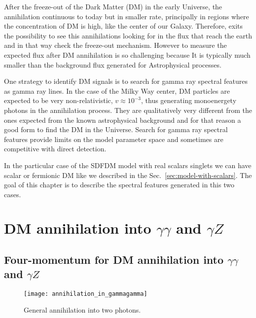 
After the freeze-out of the Dark Matter (DM) in the early Universe, the annihilation continuous to today but in smaller rate, principally in regions where the concentration of DM is high, like the center of our Galaxy.
Therefore, exits the possibility to see this annihilations looking for in the flux that reach the earth and in that way check the freeze-out mechanism. However to measure the expected flux after DM annihilation is so challenging because It is typically much smaller than the background flux generated for Astrophysical processes.

One strategy to identify DM signals is to search for gamma ray spectral features as gamma ray lines.
In the case of the Milky Way center, DM particles are expected to be very non-relativistic, $v\approx 10^{-3}$, thus generating monoenergety photons in the annihilation process. They are qualitatively very different from the ones expected from the known astrophysical background and for that reason a good form to find the DM in the Universe.
Search for gamma ray spectral features provide limits on the model parameter space and sometimes are competitive with direct detection.  

In the particular case of the SDFDM model with real scalars singlets we can have scalar or fermionic DM like we described in the Sec.~\ref{sec:model-with-scalars}. The goal of this chapter is to describe the spectral features generated in this two cases.





\section{DM annihilation into $\gamma\gamma$ and $\gamma Z$}

\subsection{Four-momentum for DM annihilation into $\gamma\gamma$ and $\gamma Z$}

\begin{figure}[h]
\begin{center}
\texttt{[image: annihilation\_in\_gammagamma]}
\end{center}
\caption{General annihilation into two photons.}
\label{fig:annihilationgg}
\end{figure}

